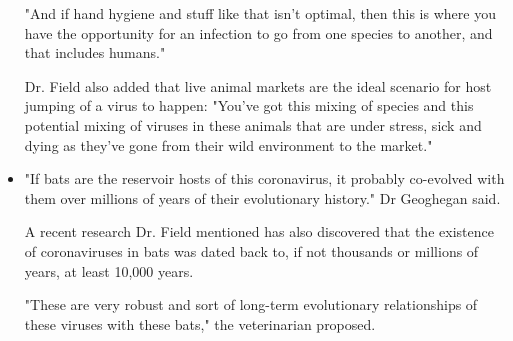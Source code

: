 \begin{itemize}
        \par "And if hand hygiene and stuff like that isn't optimal, then this is where you have the opportunity for an infection to go from one species to another, and that includes humans."
        \par Dr. Field also added that live animal markets are the ideal scenario for host jumping of a virus to happen:
        "You've got this mixing of species and this potential mixing of viruses in these animals that are under stress, sick and dying as they've gone from their wild environment to the market."
        \item "If bats are the reservoir hosts of this coronavirus, it probably co-evolved with them over millions of years of their evolutionary history." Dr Geoghegan said.
        \par A recent research Dr. Field mentioned has also discovered that the existence of coronaviruses in bats was dated back to, if not thousands or millions of years, at least 10,000 years.
        \par "These are very robust and sort of long-term evolutionary relationships of these viruses with these bats," the veterinarian proposed.
      \end{itemize}

